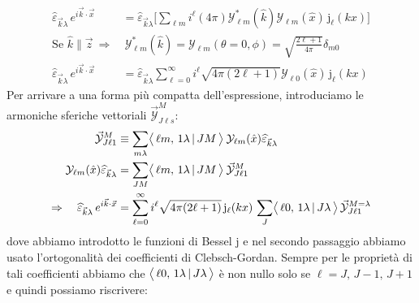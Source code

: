 \begin{displaymath}
\begin{aligned}
\widehat{\varepsilon}_{\vec{k}\lambda}\, e^{i\vec{k}\cdot\vec{x}} &= \widehat{\varepsilon}_{\vec{k}\lambda} \Biggl [ \sum_{\ell m} i^\ell (4\pi) \mathcal{Y}_{\ell m}^*(\hat{k})\mathcal{Y}_{\ell m}(\hat{x})\, \mathrm{j}_\ell (kx) \Biggr ] \\
%
\text{Se } \hat{k} \parallel \vec{z} \:\Rightarrow&\: \mathcal{Y}_{\ell m}^* (\hat{k}) = \mathcal{Y}_{\ell m} (\theta=0,\phi) = \sqrt{\frac{2\ell+1}{4\pi}} \delta_{m0} \\
%
\widehat{\varepsilon}_{\vec{k}\lambda}\, e^{i\vec{k}\cdot\vec{x}} &= \widehat{\varepsilon}_{\vec{k}\lambda} \sum_{\ell=0}^\infty i^\ell \sqrt{4\pi(2\ell+1)} \mathcal{Y}_{\ell 0}(\hat{x})\, \mathrm{j}_\ell (kx)
\end{aligned}
\end{displaymath}
Per arrivare a una forma più compatta dell'espressione, introduciamo le armoniche sferiche vettoriali $\vec{\mathcal{Y}}^M_{J\ell s}$:
\begin{displaymath}
\begin{aligned}
\vec{\mathcal{Y}}^M_{J\ell 1} &\equiv \sum_{m\lambda} \bigl\langle\, \ell m ,\, 1\lambda\, |\, JM\, \bigr\rangle\: \mathcal{Y}_{\ell m} (\hat{x}) \widehat{\varepsilon}_{\vec{k}\lambda} \\
\mathcal{Y}_{\ell m} (\hat{x}) \widehat{\varepsilon}_{\vec{k}\lambda} &= \sum_{JM} \bigl\langle\, \ell m ,\, 1\lambda\, |\, JM\, \bigr\rangle \: \vec{\mathcal{Y}}^M_{J\ell 1} \\
\Rightarrow\quad \widehat{\varepsilon}_{\vec{k}\lambda}\, e^{i\vec{k}\cdot\vec{x}} &= \sum_{\ell=0}^\infty i^\ell \sqrt{4\pi(2\ell+1)}\, \mathrm{j}_\ell (kx) \, \sum_J \bigl\langle\, \ell 0 ,\, 1\lambda\, |\, J\lambda\, \bigr\rangle\, \vec{\mathcal{Y}}^{M=\lambda}_{J\ell 1}
\end{aligned}
\end{displaymath}
dove abbiamo introdotto le funzioni di Bessel $\mathrm{j}$ e nel secondo passaggio abbiamo usato l'ortogonalità dei coefficienti di Clebsch-Gordan. Sempre per le proprietà di tali coefficienti abbiamo che $\bigl\langle\, \ell 0,\, 1\lambda\, |\, J\lambda\, \bigr\rangle$ è non nullo solo se $\ell = J,\,J-1,\,J+1$ e quindi possiamo riscrivere:
